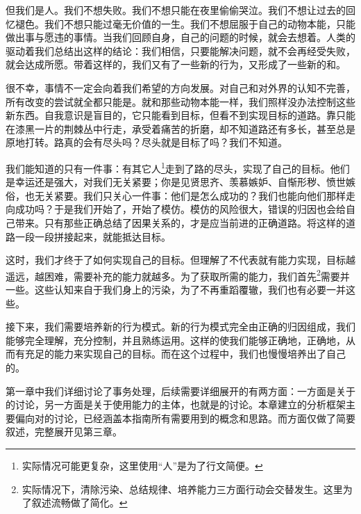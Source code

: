但我们是人。我们不想失败。我们不想只能在夜里偷偷哭泣。我们不想让过去的回忆褪色。我们不想只能过毫无价值的一生。我们不想屈服于自己的动物本能，只能做出事与愿违的事情。当我们回顾自身，自己的问题的时候，就会去想着。人类的驱动着我们总结出这样的结论：我们相信，只要能解决问题，就不会再经受失败，就会达成所愿。带着这样的，我们又有了一些新的行为，又形成了一些新的和。

很不幸，事情不一定会向着我们希望的方向发展。对自己和对外界的认知不完善，所有改变的尝试就全都只能是。就和那些动物本能一样，我们照样没办法控制这些新东西。自我意识是盲目的，它只能看到目标，但看不到实现目标的道路。靠只能在漆黑一片的荆棘丛中行走，承受着痛苦的折磨，却不知道路还有多长，甚至总是原地打转。路真的会有尽头吗？尽头就是目标了吗？我们不知道。

我们能知道的只有一件事：有其它人\footnote{实际情况可能更复杂，这里使用“人”是为了行文简便。}走到了路的尽头，实现了自己的目标。他们是幸运还是强大，对我们无关紧要；你是见贤思齐、羡慕嫉妒、自惭形秽、愤世嫉俗，也无关紧要。我们只关心一件事：他们是怎么成功的？我们也能向他们那样走向成功吗？于是我们开始了，开始了模仿。模仿的风险很大，错误的归因也会给自己带来。只有那些正确总结了因果关系的，才是应当前进的正确道路。将这样的道路一段一段拼接起来，就能抵达目标。

这时，我们才终于了如何实现自己的目标。但理解了不代表就有能力实现，目标越遥远，越困难，需要补充的能力就越多。为了获取所需的能力，我们首先\footnote{实际情况下，清除污染、总结规律、培养能力三方面行动会交替发生。这里为了叙述流畅做了简化。}需要并一些。这些认知来自于我们身上的污染，为了不再重蹈覆辙，我们也有必要一并这些。

接下来，我们需要培养新的行为模式。新的行为模式完全由正确的归因组成，我们能够完全理解，充分控制，并且熟练运用。这样的使我们能够正确地，正确地，从而有充足的能力来实现自己的目标。而在这个过程中，我们也慢慢培养出了自己的。


第一章中我们详细讨论了事务处理，后续需要详细展开的有两方面：一方面是关于的讨论，另一方面是关于使用能力的主体，也就是的讨论。本章建立的分析框架主要偏向对的讨论，已经涵盖本指南所有需要用到的概念和思路。而方面仅做了简要叙述，完整展开见第三章。

